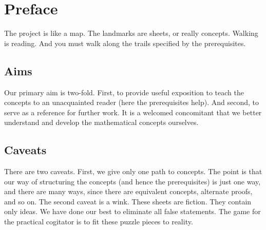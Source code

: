 
\section*{Preface}

The project is like a map.
The landmarks are sheets, or really concepts.
Walking is reading.
And you must walk along the trails specified by the prerequisites.

\subsection*{Aims}

Our primary aim is two-fold.
First, to provide useful exposition to teach the concepts to an unacquainted reader (here the prerequisites help).
And second, to serve as a reference for further work.
It is a welcomed concomitant that we better understand and develop the mathematical concepts ourselves.

\subsection*{Caveats}

There are two caveats.
First, we give only one path to concepts.
The point is that our way of structuring the concepts (and hence the prerequisites) is just one way, and there are many ways, since there are equivalent concepts, alternate proofs, and so on.
The second caveat is a wink.
These sheets are fiction.
They contain only ideas.
We have done our best to eliminate all false statements.
The game for the practical cogitator is to fit these puzzle pieces to reality.
